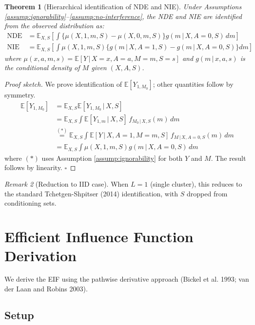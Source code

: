 \documentclass[11pt]{article}
\theoremstyle{plain}
\newtheorem{theorem}{Theorem}
\theoremstyle{definition}
\theoremstyle{remark}
\newtheorem{remark}[theorem]{Remark}
\newcommand{\E}{\mathbb{E}}
\newcommand{\given}{\,|\,}
\begin{document}
\begin{theorem}[Hierarchical identification of NDE and NIE]
\label{thm:identification}
Under Assumptions \ref{assump:ignorability}--\ref{assump:no-interference}, the NDE and NIE are identified from the observed distribution as:
\begin{align}
    \text{NDE} &= \E_{X, S}\!\left[\int \!\!\big\{ \mu(X, 1, m, S) - \mu(X, 0, m, S) \big\} g(m \given X, A=0, S)\, dm \right] \\
    \text{NIE} &= \E_{X, S}\!\left[\int \!\! \mu(X, 1, m, S) \big\{ g(m \given X, A=1, S) - g(m \given X, A=0, S) \big\} dm \right]
\end{align}
where $\mu(x, a, m, s) = \E[Y \given X=x, A=a, M=m, S=s]$ and $g(m \given x, a, s)$ is the conditional density of $M$ given $(X, A, S)$.
\end{theorem}

\begin{proof}[Proof sketch]
We prove identification of $\E[Y_{1, M_0}]$; other quantities follow by symmetry.
\begin{align}
    \E[Y_{1, M_0}] 
    &= \E_{X,S} \E[Y_{1, M_0} \given X, S] \\
    &= \E_{X,S} \int \E[Y_{1, m} \given X, S] \, f_{M_0 \given X, S}(m) \, dm \\
    &\stackrel{(*)}{=} \E_{X,S} \int \E[Y \given X, A=1, M=m, S] \, f_{M \given X, A=0, S}(m) \, dm \\
    &= \E_{X,S} \int \mu(X, 1, m, S) g(m \given X, A=0, S) \, dm
\end{align}
where $(*)$ uses Assumption \ref{assump:ignorability} for both $Y$ and $M$. The result follows by linearity. $\square$
\end{proof}

\begin{remark}[Reduction to IID case]
When $L = 1$ (single cluster), this reduces to the standard Tchetgen-Shpitser (2014) identification, with $S$ dropped from conditioning sets.
\end{remark}

\section{Efficient Influence Function Derivation}
\label{sec:eif}

We derive the EIF using the pathwise derivative approach (Bickel et al. 1993; van der Laan and Robins 2003).

\subsection{Setup}
\end{document}
